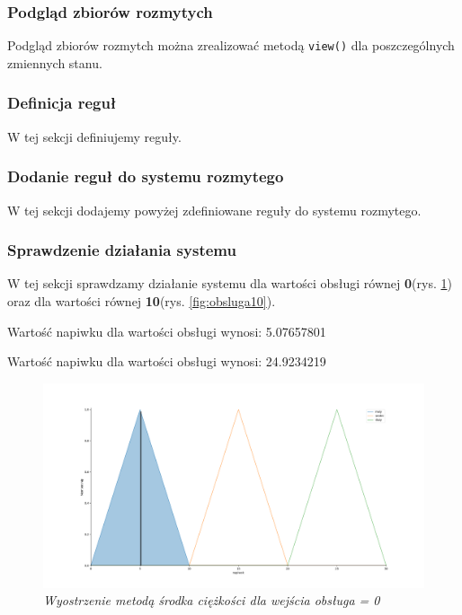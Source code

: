 \documentclass[a4paper, 10pt]{article}
\begin{document}


\subsubsection{Podgląd zbiorów rozmytych}\label{p4}

Podgląd zbiorów rozmytch można zrealizować metodą \verb|view()| dla poszczególnych zmiennych stanu.



\subsubsection{Definicja reguł}\label{p5}

W tej sekcji definiujemy reguły.



\subsubsection{Dodanie reguł do systemu rozmytego}\label{p6}

W tej sekcji dodajemy powyżej zdefiniowane reguły do systemu rozmytego.



\subsubsection{Sprawdzenie działania systemu}\label{p7}

W tej sekcji sprawdzamy działanie systemu dla wartości obsługi równej \textbf{0}(rys. \ref{fig:obsluga0}) oraz dla wartości równej \textbf{10}(rys. \ref{fig:obsluga10}).



Wartość napiwku dla wartości obsługi wynosi: 5.07657801

Wartość napiwku dla wartości obsługi wynosi: 24.9234219

\begin{figure}[H]
	\centering
	\includegraphics[scale=0.25]{Figure_3.png}
	\caption{\textit{Wyostrzenie metodą środka ciężkości dla wejścia obsługa = 0}}
	\label{fig:obsluga0}
\end{figure}
\end{document}
